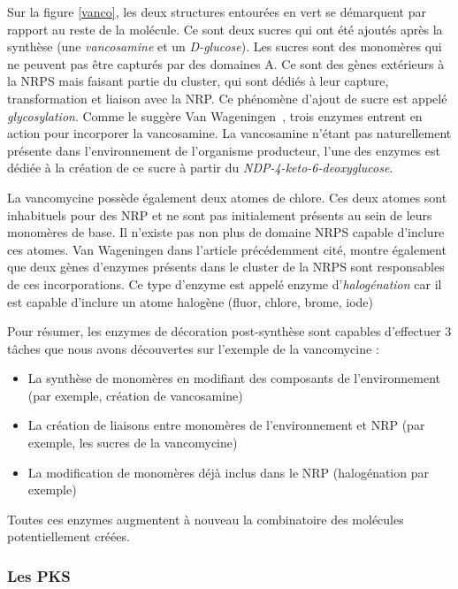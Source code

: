 Sur la figure \ref{vanco}, les deux structures entourées en vert se démarquent par rapport au reste de la molécule.
Ce sont deux sucres qui ont été ajoutés après la synthèse (une \textit{vancosamine} et un \textit{D-glucose}).
Les sucres sont des monomères qui ne peuvent pas être capturés par des domaines A.
Ce sont des gènes extérieurs à la NRPS mais faisant partie du cluster, qui sont dédiés à leur capture, transformation et liaison avec la NRP.
Ce phénomène d'ajout de sucre est appelé \textit{glycosylation}.
Comme le suggère Van Wageningen~\cite{van_wageningen_sequencing_1998}, trois enzymes entrent en action pour incorporer la vancosamine.
La vancosamine n'étant pas naturellement présente dans l'environnement de l'organisme producteur, l'une des enzymes est dédiée à la création de ce sucre à partir du \textit{NDP-4-keto-6-deoxyglucose}.

La vancomycine possède également deux atomes de chlore.
Ces deux atomes sont inhabituels pour des NRP et ne sont pas initialement présents au sein de leurs monomères de base.
Il n'existe pas non plus de domaine NRPS capable d'inclure ces atomes.
Van Wageningen dans l'article précédemment cité, montre également que deux gènes d'enzymes présents dans le cluster de la NRPS sont responsables de ces incorporations.
Ce type d'enzyme est appelé enzyme d'\textit{halogénation} car il est capable d'inclure un atome halogène (fluor, chlore, brome, iode)

Pour résumer, les enzymes de décoration post-synthèse sont capables d'effectuer 3 tâches que nous avons découvertes sur l'exemple de la vancomycine :
\begin{itemize}
  \item La synthèse de monomères en modifiant des composants de l'environnement (par exemple, création de vancosamine)
  \item La création de liaisons entre monomères de l'environnement et NRP (par exemple, les sucres de la vancomycine)
  \item La modification de monomères déjà inclus dans le NRP (halogénation par exemple)
\end{itemize}

Toutes ces enzymes augmentent à nouveau la combinatoire des molécules potentiellement créées.



\subsubsection{Les PKS}

